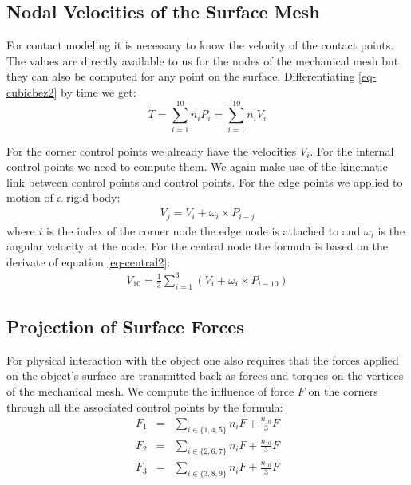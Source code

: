 \documentclass{egpubl}
\begin{document}
\subsection{Nodal Velocities of the Surface Mesh}

For contact modeling it is necessary to know the velocity of the contact points.
The values are directly available to us for the nodes of the mechanical mesh
but they can also be computed for any point on the surface.
Differentiating \eqref{eq-cubicbez2} by time we get:
%
\begin{equation}
    \dot{T} = \sum_{i=1}^{10} n_i \dot{P_i} = \sum_{i=1}^{10} n_i V_i
\end{equation}

For the corner control points  we
already have the velocities $V_i$. For the internal control points  we need to compute
them. We again make use of the kinematic link between control points and control points.
For the edge points we applied to motion of a rigid body:
%
\begin{eqnarray}
    V_j = V_i + \omega_i \times P_{i-j}
\end{eqnarray}
%
where $i$ is the index of the corner node the edge node is attached to and
$\omega_i$ is the angular velocity at the node. For the central node
the formula is based on the derivate of equation \eqref{eq-central2}:
%
\begin{eqnarray}
    V_{10} = \frac{1}{3} \sum_{i=1}^3 \left( V_i + \omega_i \times P_{i-10} \right)
\end{eqnarray}

\subsection{Projection of Surface Forces}

For physical interaction with the object one also requires that the
forces applied on the object's surface are transmitted back as forces
and torques on the vertices of the mechanical mesh.
We compute the influence of force $F$ on the corners through all the
associated control points by the formula:
%
\begin{eqnarray}
    F_1 & = &  \sum_{i \in \{1,4,5\}} n_i F + \frac{n_{10}}{3} F \\
    F_2 & = &  \sum_{i \in \{2,6,7\}} n_i F + \frac{n_{10}}{3} F \\
    F_3 & = &  \sum_{i \in \{3,8,9\}} n_i F + \frac{n_{10}}{3} F 
\end{eqnarray}
\end{document}
